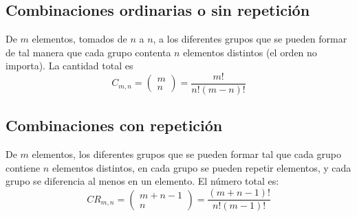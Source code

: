 \documentclass{./Probabilidad.tex}
\begin{document}
\subsection{Combinaciones ordinarias o sin repetición}
De $m$ elementos, tomados de $n$ a $n$, a los diferentes grupos que se pueden formar de tal manera que cada grupo contenta $n$ elementos distintos (el orden no importa). La cantidad total es
$$
C_{m,n} = \begin{pmatrix}
m \\ n
\end{pmatrix} = \frac{m!}{n!(m-n)!}
$$
\subsection{Combinaciones con repetición}
De $m$ elementos, los diferentes grupos que se pueden formar tal que cada grupo contiene $n$ elementos distintos, en cada grupo se pueden repetir elementos, y cada grupo se diferencia al menos en un elemento. El número total es:
$$
CR_{m,n} = \begin{pmatrix}
m+n-1 \\ n
\end{pmatrix} = \frac{(m+n-1)!}{n!(m-1)!}
$$
\end{document}
